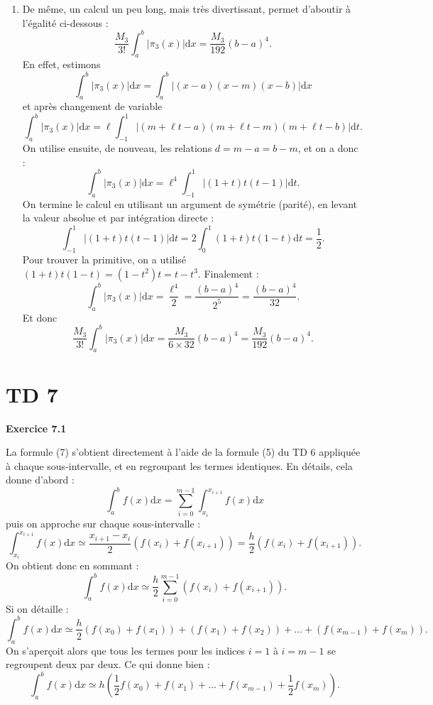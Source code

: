 \documentclass{article}
\begin{document}
\begin{enumerate}
    \[
    \int_{-1}^1 ( 1 + t ) ( -1 +  t ) \mathrm{d}t
    =
     ( -1 + \frac13 ) - ( 1 - \frac13 )
    = 
      -2 + \frac23 = - \frac43.
    \]
    Ainsi, on a déjà :
    \[
    \int_a^b | \pi_2(x) | \mathrm{d}x
     = - \ell^3 \left ( - \frac43 \right )
     = \frac{4 \ell^3}{3}
     = \frac{4 (b-a)^3}{3 \times 8}
     = \frac{(b-a)^3}{6}.
    \]
    Et on obtient finalement :
    \[
    \frac{M_2}{2!} \int_a^b | \pi_2(x) | \mathrm{d}x
    = \frac{M_2}{12} (b-a)^3.
    \]
    \item De même, un calcul un peu long, mais très divertissant, permet d'aboutir à l'égalité ci-dessous :
    \[
    \frac{M_3}{3!} \int_a^b | \pi_3(x) | \mathrm{d}x
    = \frac{M_3}{192} (b-a)^4.
    \]
    En effet, estimons 
    \[
    \int_a^b | \pi_3(x) | \mathrm{d}x
    = 
    \int_a^b | ( x - a ) ( x - m ) ( x - b) | \mathrm{d}x
    \]
    et après changement de variable
    \[
    \int_a^b | \pi_3(x) | \mathrm{d}x
    = 
    \ell 
    \int_{-1}^1 | ( m + \ell t - a ) ( m + \ell t - m ) ( m + \ell t - b ) | \mathrm{d}t.
    \]
    On utilise ensuite, de nouveau, les relations $d=m-a=b-m$, et on a donc :
    \[
    \int_a^b | \pi_3(x) | \mathrm{d}x
    = 
    \ell^4 
    \int_{-1}^1 | ( 1 +  t  ) t ( t - 1 ) | \mathrm{d}t.
    \]
    On termine le calcul en utilisant un argument de symétrie (parité), en levant la valeur absolue et par intégration directe :
    \[
    \int_{-1}^1 | ( 1 +  t  ) t ( t - 1 ) | \mathrm{d}t
    = 
    2 \int_{0}^1 ( 1 +  t  ) t ( 1 - t )  \mathrm{d}t = \frac12.
    \]
    Pour trouver la primitive, on a utilisé $( 1 +  t  ) t ( 1 - t ) = (1-t^2) t = t - t^3$.
    Finalement :
     \[
    \int_a^b | \pi_3(x) | \mathrm{d}x
    = 
    \frac{\ell^4}2 = \frac{(b-a)^4}{2^5}
    = \frac{(b-a)^4}{32}.
    \]
    Et donc
    \[
    \frac{M_3}{3!} \int_a^b | \pi_3(x) | \mathrm{d}x = 
    \frac{M_3}{6 \times 32} (b-a)^4
    = \frac{M_3}{192} (b-a)^4.
    \]
\end{enumerate}

\newpage

\section{TD 7}

{\bf Exercice 7.1}

La formule (7) s'obtient directement à l'aide de la formule (5) du TD 6 appliquée à chaque sous-intervalle, et en regroupant les termes identiques. En détails, cela donne d'abord :
\[
\int_a^b f(x) \mathrm{d}x = \sum_{i=0}^{m-1} \int_{x_i}^{x_{i+1}} f(x) \mathrm{d}x
\]
puis on approche sur chaque sous-intervalle :
\[
\int_{x_i}^{x_{i+1}} f(x) \mathrm{d}x \simeq \frac{x_{i+1}-x_i}{2} (f(x_i) + f(x_{i+1}))
= \frac{h}{2} (f(x_i) + f(x_{i+1})).
\]
On obtient donc en sommant :
\[
\int_a^b f(x) \mathrm{d}x \simeq \frac{h}{2} \sum_{i=0}^{m-1} (f(x_i) + f(x_{i+1})).
\]
Si on détaille :
\[
\int_a^b f(x) \mathrm{d}x \simeq \frac{h}{2} 
( f(x_0) + f(x_1)) + (f(x_1) + f(x_2)) + \ldots + (f(x_{m-1}) + f(x_m)).
\]
On s'aperçoit alors que tous les termes pour les indices $i=1$ à $i=m-1$ se regroupent deux par deux. Ce qui donne bien :
\[
\int_a^b f(x) \mathrm{d}x \simeq h
( \frac12 f(x_0) + f(x_1) + \ldots + f(x_{m-1}) + \frac12 f(x_m)).
\]
\medskip
\end{document}
